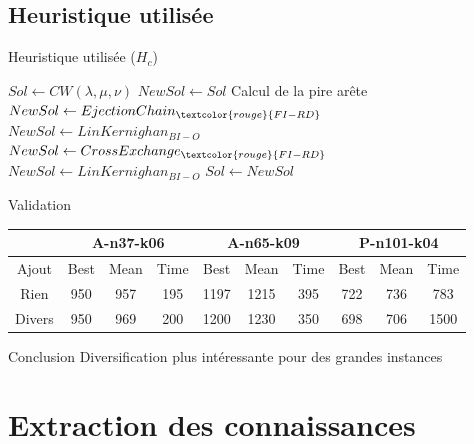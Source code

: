 \documentclass{beamer}
\begin{document}
\subsection{Heuristique utilisée}

\begin{frame}{Heuristique utilisée ($H_c$)}

\begin{algorithm}[H]
\DontPrintSemicolon %

$Sol \gets CW(\lambda,\mu,\nu)$\;
$NewSol \gets Sol$\;
 {
	Calcul de la pire arête\;
	$NewSol \gets EjectionChain_{\textcolor{rouge}{FI-RD}}$\;
	$NewSol \gets LinKernighan_{BI-O}$\;
	$NewSol \gets CrossExchange_{\textcolor{rouge}{FI-RD}}$\;
	$NewSol \gets LinKernighan_{BI-O}$\;
	 {
		$Sol \gets NewSol$\;
	}
	\textcolor{rouge}{
	}
}
\;

\end{algorithm}
\end{frame}

\begin{frame}{Validation}

\begin{tabular}{|c|c|c|c|c|c|c|c|c|c|}
   \hline
    & \multicolumn{3}{c|}{A-n37-k06} & \multicolumn{3}{c|}{A-n65-k09} & \multicolumn{3}{c|}{P-n101-k04} \\
   \hline
   Ajout & Best & Mean & Time & Best & Mean & Time & Best & Mean & Time \\
   \hline
   Rien &  950 & 957 & 195 & 1197 & 1215 & 395 & 722 & 736 & 783  \\   
   \hline
   Divers & 950 & 969 & 200 & 1200 & 1230 & 350 & 698 & 706 & 1500  \\
   \hline
\end{tabular}

\begin{block}{Conclusion}
Diversification plus intéressante pour des grandes instances
\end{block}



\end{frame}


\section{Extraction des connaissances}
\end{document}
